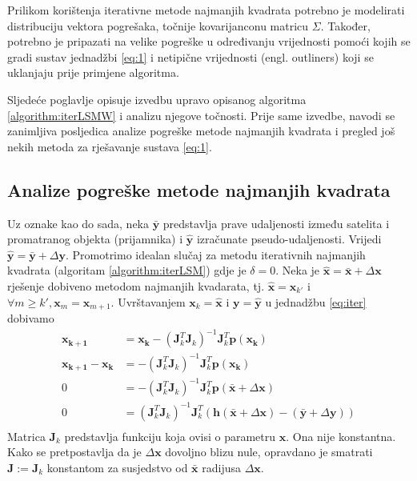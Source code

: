 \documentclass[a4paper,twoside,12pt]{memoir} %
\begin{document}
Prilikom korištenja iterativne metode najmanjih kvadrata potrebno je
modelirati distribuciju vektora pogrešaka, točnije kovarijanconu matricu $\Sigma$.
Također, potrebno je pripazati na 
velike pogreške u određivanju vrijednosti pomoći kojih se gradi sustav jednadžbi 
\ref{eq:1} i netipične vrijednosti (engl. outliners) koji se uklanjaju prije primjene algoritma.

Sljedeće poglavlje opisuje izvedbu upravo opisanog algoritma \ref{algorithm:iterLSMW} i 
analizu njegove točnosti. Prije same izvedbe, navodi se zanimljiva posljedica
analize pogreške metode najmanjih kvadrata i pregled još nekih metoda za rješavanje
sustava \ref{eq:1}.
\subsection{Analize pogreške metode najmanjih kvadrata}
Uz oznake kao do sada, neka $\bar{\mathbf{y}}$ predstavlja prave udaljenosti između satelita i promatranog objekta (prijamnika) i $\hat{\mathbf{y}}$ izračunate pseudo-udaljenosti. 
Vrijedi
$\hat{\mathbf{y}} = \bar{\mathbf{y}} + \Delta \mathbf{y}$.
Promotrimo idealan slučaj za metodu iterativnih najmanjih kvadrata (algoritam \ref{algorithm:iterLSM}) gdje je $\delta = 0$.
Neka je $\hat{\mathbf{x}} = \bar{\mathbf{x}} + \Delta \mathbf{x}$ rješenje dobiveno metodom najmanjih kvadarata, tj. 
$\hat{\mathbf{x}} = \mathbf{x}_{k'}$ i $\forall m \geq k', \mathbf{x}_m = \mathbf{x}_{m+1}$.
Uvrštavanjem $\mathbf{x}_k = \hat{\mathbf{x}}$ i $\mathbf{y} = \hat{\mathbf{y}}$ u jednadžbu \ref{eq:iter} dobivamo
\begin{align*}
	\mathbf{x_{k+1}} &= \mathbf{x_{k}} - (\mathbf{J}_k^T\mathbf{J}_k)^{-1}\mathbf{J}_k^T \mathbf{p}(\mathbf{x_k}) \\
	\mathbf{x_{k+1}} - \mathbf{x_{k}} &= - (\mathbf{J}_k^T\mathbf{J}_k)^{-1}\mathbf{J}_k^T \mathbf{p}(\mathbf{x_k}) \\
	0 &= - (\mathbf{J}_k^T\mathbf{J}_k)^{-1}\mathbf{J}_k^T \mathbf{p}(\bar{\mathbf{x}} + \Delta \mathbf{x}) \\
	0 &= (\mathbf{J}_k^T\mathbf{J}_k)^{-1}\mathbf{J}_k^T (\mathbf{h}(\bar{\mathbf{x}} + \Delta \mathbf{x}) -(\bar{\mathbf{y}} + \Delta \mathbf{y}))\\
\end{align*}
Matrica $\mathbf{J}_k$ predstavlja funkciju koja ovisi o parametru $\mathbf{x}$. Ona nije konstantna.
Kako 
se pretpostavlja da je $\Delta \mathbf{x}$ dovoljno blizu nule, opravdano je smatrati $\mathbf{\mathbf{J}} := \mathbf{\mathbf{J}}_k$ konstantom za susjedstvo od $\bar{\mathbf{x}}$ radijusa $\Delta \mathbf{x}$.
\end{document}
